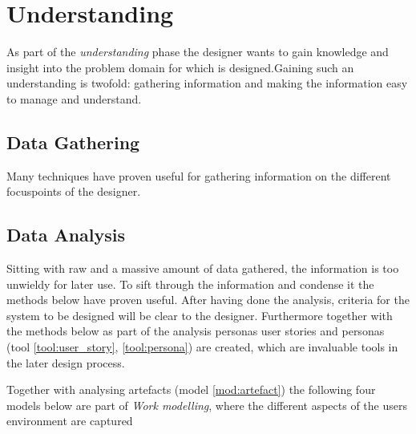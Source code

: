 \section{Understanding} \label{sec:understanding}
As part of the \emph{understanding} phase the designer wants to gain knowledge and insight into the problem domain for which is designed.Gaining such an understanding is twofold: gathering information and making the information easy to manage and understand.

\subsection{Data Gathering} \label{sec:data_gathering}
Many techniques have proven useful for gathering information on the different focuspoints of the designer.






\subsection{Data Analysis} \label{sec:data_analysis}
Sitting with raw and a massive amount of data gathered, the information is too unwieldy for later use. To sift through the information and condense it the methods below have proven useful. After having done the analysis, criteria for the system to be designed will be clear to the designer. Furthermore together with the methods below as part of the analysis personas user stories and personas (tool \ref{tool:user_story}, \ref{tool:persona}) are created, which are invaluable tools in the later design process.



Together with analysing artefacts (model \ref{mod:artefact}) the following four models below are part of \emph{Work modelling}, where the different aspects of the users environment are captured \cite[p. 277]{benyon_10} 





